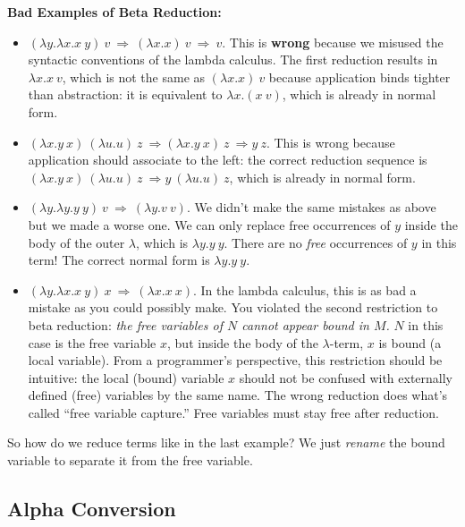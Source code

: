 {\flushleft\bf Bad Examples of Beta Reduction:}
\begin{itemize}
\item $(\lambda y.\lambda x.x~y)~ v ~\Rightarrow~ (\lambda x.x)~ v
  ~\Rightarrow~ v$.  This is {\bf wrong} because we misused the
  syntactic conventions of the lambda calculus.  The first reduction
  results in $\lambda x.x~v$, which is not the same as $(\lambda x.x)~v$ because
  application binds tighter than abstraction: it is equivalent to
  $\lambda x.(x~v)$, which is already in normal form.

\item $ (\lambda x.y~ x)~ (\lambda u.u) ~z  ~\Rightarrow (\lambda x.y~ x)~z
  ~\Rightarrow y~z$.  This is wrong because application should associate
  to the left: the correct reduction sequence is
$ (\lambda x.y~ x)~ (\lambda u.u) ~z  ~\Rightarrow y~ (\lambda u.u)~z$,
which is already in normal form.

\item  $(\lambda y.\lambda y.y~y)~ v ~\Rightarrow~ (\lambda y.v~v)$.  We
  didn't make the same mistakes as above but we made a worse
  one. We can only replace free occurrences of $y$ inside the
  body of the outer $\lambda$, which is $\lambda y.y~y$.  There are no
  {\em free\/} occurrences of $y$ in this term!  The correct normal form
  is $\lambda y.y~y$.

\item $(\lambda y.\lambda x.x~y)~ x ~\Rightarrow~ (\lambda x.x~x)$.
  In the lambda calculus, this is as bad a mistake as you could possibly
  make.  You violated the second restriction to beta reduction: {\em the
    free variables of $N$ cannot appear bound in $M$.\/}  $N$ in this case is
    the free variable $x$, but inside the body of the $\lambda$-term, $x$
    is bound (a local variable).  From a programmer's perspective, this restriction
    should be intuitive: the local (bound) variable $x$ should not be confused with
    externally defined (free) variables by the same name.  The wrong reduction
    does what's called ``free variable capture.''  Free variables must stay
    free after reduction.
\end{itemize}
So how do we reduce terms like in the last example?  We just
{\em rename\/} the bound variable to separate it from the free
variable.

\subsection*{Alpha Conversion}

